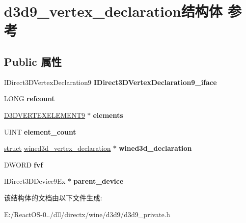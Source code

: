 \hypertarget{structd3d9__vertex__declaration}{}\section{d3d9\+\_\+vertex\+\_\+declaration结构体 参考}
\label{structd3d9__vertex__declaration}
\subsection*{Public 属性}
\begin{DoxyCompactItemize}
\item 
\mbox{\label{structd3d9__vertex__declaration_a030e353c1c8a589307c6199c2d569832}} 
I\+Direct3\+D\+Vertex\+Declaration9 {\bfseries I\+Direct3\+D\+Vertex\+Declaration9\+\_\+iface}
\item 
\mbox{\label{structd3d9__vertex__declaration_a783a9e3a529e0902999cc3c08ab55f45}} 
L\+O\+NG {\bfseries refcount}
\item 
\mbox{\label{structd3d9__vertex__declaration_a74659cfdb40c601561a0247baccdf68d}} 
\hyperlink{struct___d3_d_v_e_r_t_e_x_e_l_e_m_e_n_t9}{D3\+D\+V\+E\+R\+T\+E\+X\+E\+L\+E\+M\+E\+N\+T9} $\ast$ {\bfseries elements}
\item 
\mbox{\label{structd3d9__vertex__declaration_a8f49df089090842ec451a61f9472753e}} 
U\+I\+NT {\bfseries element\+\_\+count}
\item 
\mbox{\label{structd3d9__vertex__declaration_a8a1a3c8af681f0f8adb44e135cec8fc8}} 
\hyperlink{interfacestruct}{struct} \hyperlink{structwined3d__vertex__declaration}{wined3d\+\_\+vertex\+\_\+declaration} $\ast$ {\bfseries wined3d\+\_\+declaration}
\item 
\mbox{\label{structd3d9__vertex__declaration_ac42e247c3d96343d01bea89856a2119a}} 
D\+W\+O\+RD {\bfseries fvf}
\item 
\mbox{\label{structd3d9__vertex__declaration_a391b761234bab4404996bee8becb0ac6}} 
I\+Direct3\+D\+Device9\+Ex $\ast$ {\bfseries parent\+\_\+device}
\end{DoxyCompactItemize}


该结构体的文档由以下文件生成\+:\begin{DoxyCompactItemize}
\item 
E\+:/\+React\+O\+S-\/0../dll/directx/wine/d3d9/d3d9\+\_\+private.\+h\end{DoxyCompactItemize}
